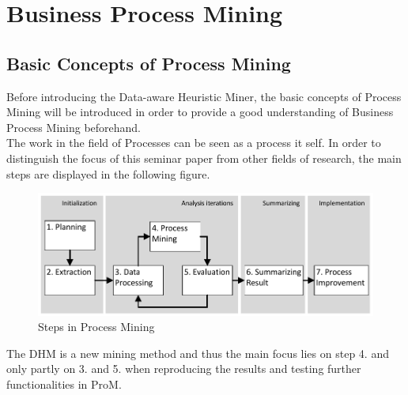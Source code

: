 
\chapter{Business Process Mining} %

\label{Chapter2} %




\section{Basic Concepts of Process Mining}
Before introducing the Data-aware Heuristic Miner, the basic concepts of Process Mining will be introduced in order to provide a good understanding of Business Process Mining beforehand.\\
\noindent The work in the field of Processes can be seen as a process it self. In order to distinguish the focus of this seminar paper from other fields of research, the main steps are displayed in the following figure.

\begin{figure}[H]
\includegraphics[width=14cm]{Chapters/Notizen_Graphics/ProcessMiningSteps.jpg}
\caption{Steps in Process Mining\protect\cite{Buijs2017}} 
\end{figure}

\noindent The DHM is a new mining method and thus the main focus lies on step 4. and only partly on 3. and 5. when reproducing the results and testing further functionalities in ProM. \protect\cite{Buijs2017}\\


